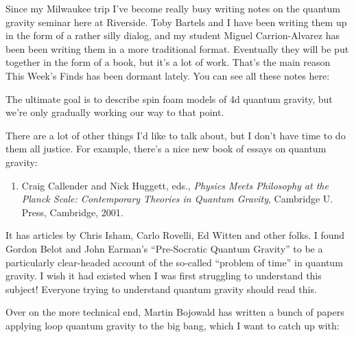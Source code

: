 \documentclass{article}
\def\tightlist{}
\renewcommand{\texttt}[1]{%
  \begingroup
  \ttfamily
  \begingroup\lccode`~=`/\lowercase{\endgroup\def~}{/\discretionary{}{}{}}%
  \begingroup\lccode`~=`[\lowercase{\endgroup\def~}{[\discretionary{}{}{}}%
  \begingroup\lccode`~=`.\lowercase{\endgroup\def~}{.\discretionary{}{}{}}%
  \catcode`/=\active\catcode`[=\active\catcode`.=\active
  \scantokens{#1\noexpand}%
  \endgroup
}
\begin{document}
Since my Milwaukee trip I've become really busy writing notes on the
quantum gravity seminar here at Riverside. Toby Bartels and I have been
writing them up in the form of a rather silly dialog, and my student
Miguel Carrion-Alvarez has been been writing them in a more traditional
format. Eventually they will be put together in the form of a book, but
it's a lot of work. That's the main reason This Week's Finds has been
dormant lately. You can see all these notes here:


The ultimate goal is to describe spin foam models of 4d quantum gravity,
but we're only gradually working our way to that point.

There are a lot of other things I'd like to talk about, but I don't have
time to do them all justice. For example, there's a nice new book of
essays on quantum gravity:

\begin{enumerate}
\def\labelenumi{\arabic{enumi})}
\setcounter{enumi}{5}
\tightlist
\item
  Craig Callender and Nick Huggett, eds., \emph{Physics Meets Philosophy
  at the Planck Scale: Contemporary Theories in Quantum Gravity},
  Cambridge U. Press, Cambridge, 2001.
\end{enumerate}

It has articles by Chris Isham, Carlo Rovelli, Ed Witten and other
folks. I found Gordon Belot and John Earman's ``Pre-Socratic Quantum
Gravity'' to be a particularly clear-headed account of the so-called
``problem of time'' in quantum gravity. I wish it had existed when I was
first struggling to understand this subject! Everyone trying to
understand quantum gravity should read this.

Over on the more technical end, Martin Bojowald has written a bunch of
papers applying loop quantum gravity to the big bang, which I want to
catch up with:
\end{document}
